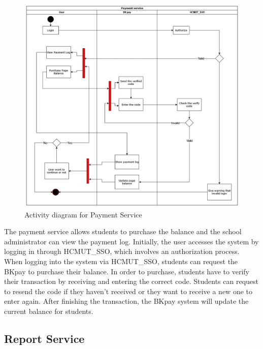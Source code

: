\begin{figure}[H]
\centering
  \includegraphics[max width=0.9\linewidth,origin = c]{chapters/4. system-modeling/activity/Activity_payment.png}
  \caption{Activity diagram for Payment Service}%
\end{figure}

The payment service allows students to purchase the balance and the school administrator can view the payment log. Initially, the user accesses the system by logging in through HCMUT\_SSO, which involves an authorization process. When logging into the system via HCMUT\_SSO, students can request the BKpay to purchase their balance. In order to purchase, students have to verify their transaction by receiving and entering the correct code. Students can request to resend the code if they haven’t received or they want to receive a new one to enter again. After finishing the transaction, the BKpay system will update the current balance for students.

\subsection{Report Service}

